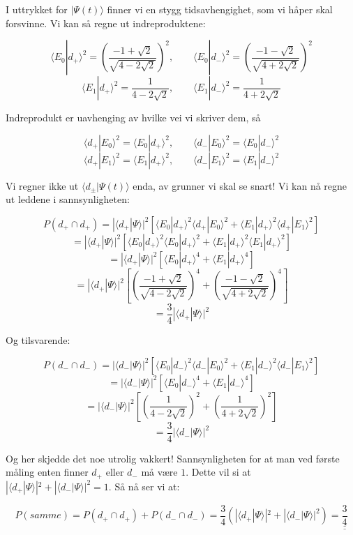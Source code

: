 \documentclass[a4paper,norsk, 10pt]{article}
\numberwithin{equation}{section}
\begin{document}
I uttrykket for $|\Psi(t)\rangle$ finner vi en stygg tidsavhengighet, som vi håper skal forsvinne. Vi kan så regne ut indreproduktene:

$$
\langle E_0|d_+\rangle^2 = \left(\frac{-1 + \sqrt{2}}{\sqrt{4-2\sqrt{2}}}\right)^2, \qquad \langle E_0|d_-\rangle^2 = \left(\frac{-1 - \sqrt{2}}{\sqrt{4+2\sqrt{2}}}\right)^2
$$
$$
\langle E_1|d_+\rangle^2 = \frac{1}{4-2\sqrt{2}} ,\qquad \langle E_1|d_-\rangle^2 = \frac{1}{4+2\sqrt{2}} 
$$

Indreprodukt er uavhenging av hvilke vei vi skriver dem, så

$$
\langle d_+|E_0\rangle^2 = \langle E_0|d_+\rangle^2 ,\qquad \langle d_-|E_0\rangle^2 = \langle E_0|d_-\rangle^2
$$
$$
\langle d_+|E_1\rangle^2 = \langle E_1|d_+\rangle^2 ,\qquad \langle d_-|E_1\rangle^2 = \langle E_1|d_-\rangle^2
$$
\newpage

Vi regner ikke ut $\langle d_{\pm}|\Psi(t)\rangle$ enda, av grunner vi skal se snart! Vi kan nå regne ut leddene i sannsynligheten:

$$
P(d_+ \cap d_+) = |\langle d_+|\Psi\rangle|^2\left[\langle E_0|d_+\rangle^2\langle d_+|E_0\rangle^2 + \langle E_1|d_+\rangle^2\langle d_+|E_1\rangle^2\right]
$$
$$
= |\langle d_+|\Psi\rangle|^2\left[\langle E_0|d_+\rangle^2\langle E_0|d_+\rangle^2 + \langle E_1|d_+\rangle^2\langle E_1|d_+\rangle^2\right]
$$
$$
= |\langle d_+|\Psi\rangle|^2\left[\langle E_0|d_+\rangle^4 + \langle E_1|d_+\rangle^4\right]
$$
$$
= |\langle d_+|\Psi\rangle|^2\left[\left(\frac{-1+\sqrt{2}}{\sqrt{4-2\sqrt{2}}}\right)^4 + \left(\frac{-1-\sqrt{2}}{\sqrt{4+2\sqrt{2}}}\right)^4\right]
$$
$$
= \frac{3}{4}|\langle d_+|\Psi\rangle|^2
$$

Og tilsvarende:

$$
P(d_- \cap d_-) = |\langle d_-|\Psi\rangle|^2\left[\langle E_0|d_-\rangle^2\langle d_-|E_0\rangle^2 + \langle E_1|d_-\rangle^2\langle d_-|E_1\rangle^2\right]
$$
$$
= |\langle d_-|\Psi\rangle|^2\left[\langle E_0|d_-\rangle^4 + \langle E_1|d_-\rangle^4\right]
$$
$$
= |\langle d_-|\Psi\rangle|^2\left[ \left(\frac{1}{4-2\sqrt{2}}\right)^2 + \left(\frac{1}{4+2\sqrt{2}}\right)^2\right]
$$
$$
= \frac{3}{4}|\langle d_-|\Psi\rangle|^2
$$

Og her skjedde det noe utrolig vakkert! Sannsynligheten for at man ved første måling enten finner $d_+$ eller $d_-$ må være $1$. Dette vil si at $|\langle d_+|\Psi\rangle|^2 + |\langle d_-|\Psi\rangle|^2 = 1$. Så nå ser vi at:

\begin{equation}
P(samme) = P(d_+ \cap d_+) + P(d_- \cap d_-) = \frac{3}{4}\left(|\langle d_+|\Psi\rangle|^2 + |\langle d_-|\Psi\rangle|^2\right) = \underline{\underline{\frac{3}{4}}}
\end{equation}
\end{document}
